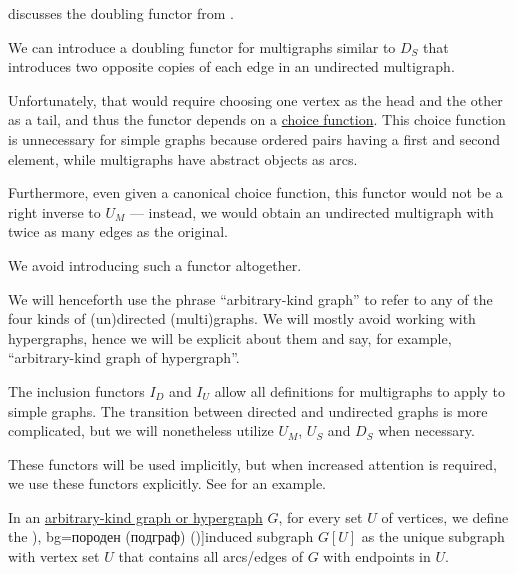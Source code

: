 \begin{comments}
  \item {} discusses the doubling functor from .
  \item We can introduce a doubling functor for multigraphs similar to \hyperref[def:graph_functors/simple_doubling]{\( D_S \)} that introduces two opposite copies of each edge in an undirected multigraph.

  Unfortunately, that would require choosing one vertex as the head and the other as a tail, and thus the functor depends on a \hyperref[def:choice_function]{choice function}. This choice function is unnecessary for simple graphs because ordered pairs having a first and second element, while multigraphs have abstract objects as arcs.

  Furthermore, even given a canonical choice function, this functor would not be a right inverse to \hyperref[def:graph_functors/multi_forgetful]{\( U_M \)} --- instead, we would obtain an undirected multigraph with twice as many edges as the original.

  We avoid introducing such a functor altogether.
\end{comments}

\begin{remark}\label{rem:arbitrary_kind_graph}
  We will henceforth use the phrase \enquote{arbitrary-kind graph} to refer to any of the four kinds of (un)directed (multi)graphs. We will mostly avoid working with hypergraphs, hence we will be explicit about them and say, for example, \enquote{arbitrary-kind graph of hypergraph}.

  The inclusion functors \hyperref[def:graph_functors/directed_inclusion]{\( I_D \)} and \hyperref[def:graph_functors/undirected_inclusion]{\( I_U \)} allow all definitions for multigraphs to apply to simple graphs. The transition between directed and undirected graphs is more complicated, but we will nonetheless utilize \hyperref[def:graph_functors/multi_forgetful]{\( U_M \)}, \hyperref[def:graph_functors/simple_forgetful]{\( U_S \)} and \hyperref[def:graph_functors/simple_doubling]{\( D_S \)} when necessary.

  These functors will be used implicitly, but when increased attention is required, we use these functors explicitly. See  for an example.
\end{remark}

\begin{definition}\label{def:induced_subgraph}
  In an \hyperref[rem:arbitrary_kind_graph]{arbitrary-kind graph or hypergraph} \( G \), for every set \( U \) of vertices, we define the \term[ru=порождённый (подграф) (\cite[17]{ЕмеличевИПр1990Графы}), bg=породен (подграф) (\cite[18]{Мирчев2001Графи})]{induced subgraph} \( G[U] \) as the unique subgraph with vertex set \( U \) that contains all arcs/edges of \( G \) with endpoints in \( U \).
\end{definition}

